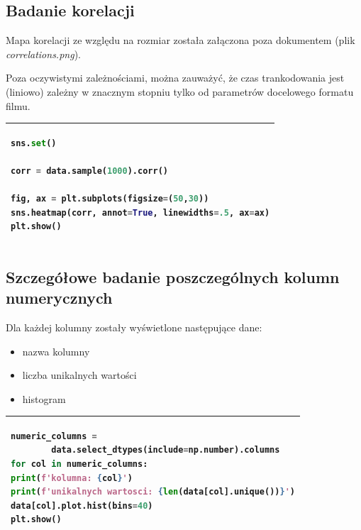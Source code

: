 \documentclass[11pt, a4paper]{article}
\begin{document}
    \subsection{Badanie korelacji}
    Mapa korelacji ze względu na rozmiar została załączona poza dokumentem (plik \textit{correlations.png}).\par
    Poza oczywistymi zależnościami, można zauważyć, że czas trankodowania jest (liniowo) zależny w znacznym stopniu tylko od parametrów docelowego formatu filmu.\par
    
    \begin{tabular}{|l|}
            \hline
            \begin{lstlisting}[language=Python]
sns.set()

corr = data.sample(1000).corr()

fig, ax = plt.subplots(figsize=(50,30))
sns.heatmap(corr, annot=True, linewidths=.5, ax=ax)
plt.show()
            \end{lstlisting}
            \\ \hline
        \end{tabular}
    
    \newpage
    \subsection{Szczegółowe badanie poszczególnych kolumn numerycznych}
    
    Dla każdej kolumny zostały wyświetlone następujące dane:\par
    \begin{itemize}
        \item nazwa kolumny
        \item liczba unikalnych wartości
        \item histogram
    \end{itemize}

    \begin{tabular}{|l|}
        \hline
        \begin{lstlisting}[language=Python]
numeric_columns = 
        data.select_dtypes(include=np.number).columns
for col in numeric_columns:
print(f'kolumna: {col}')
print(f'unikalnych wartosci: {len(data[col].unique())}')
data[col].plot.hist(bins=40)
plt.show()
        \end{lstlisting}
        \\ \hline
    \end{tabular}\\
    \vspace{0.5cm} 
    
\end{document}
